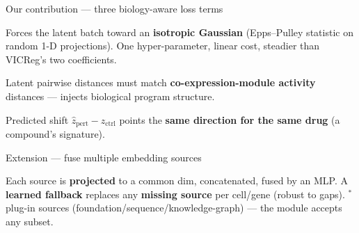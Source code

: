 \documentclass[aspectratio=169]{beamer}
\newcommand{\hl}[1]{\textcolor{accent}{\textbf{#1}}}
\newcommand{\hk}[1]{\textcolor{accent2}{\textbf{#1}}}
\begin{document}
\begin{frame}{Our contribution --- three biology-aware loss terms}
\par
\vspace{5pt}\small
\begin{card}
Forces the latent batch toward an \hl{isotropic Gaussian} (Epps--Pulley statistic on random 1-D projections).
One hyper-parameter, linear cost, steadier than VICReg's two coefficients.
\end{card}
\vspace{4pt}
\begin{card}
Latent pairwise distances must match \hl{co-expression-module activity} distances --- injects biological program structure.
\end{card}
\vspace{4pt}
\begin{card2}
Predicted shift $\hat z_{\text{pert}}-z_{\text{ctrl}}$ points the \hk{same direction for the same drug} (a compound's signature).
\end{card2}
\end{frame}

\begin{frame}{Extension --- fuse multiple embedding sources}
\vspace{2pt}\centering
{}
\par\vspace{8pt}
{\footnotesize\color{ink} Each source is \hl{projected} to a common dim, concatenated, fused by an MLP.
A \hl{learned fallback} replaces any \textbf{missing source} per cell/gene (robust to gaps).
$^\ast$ plug-in sources (foundation/sequence/knowledge-graph) --- the module accepts any subset.}
\end{frame}
\end{document}

